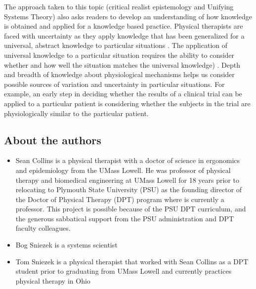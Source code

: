  The approach taken to this topic (critical realist epistemology and Unifying Systems Theory) also asks readers to develop an understanding of how knowledge is obtained and applied for a knowledge based practice. Physical therapists are faced with uncertainty as they apply knowledge that has been generalized for a universal, abstract knowledge to particular situations \cite{collins_complex_2005}. The application of universal knowledge to a particular situation requires the ability to consider whether and how well the situation matches the universal knowledge) \cite{collins_synthesis_2018, collins_particulars_2018}. Depth and breadth of knowledge about physiological mechanisms helps us consider possible sources of variation and uncertainty in particular situations. For example, an early step in deciding whether the results of a clinical trial can be applied to a particular patient is considering whether the subjects in the trial are physiologically similar to the particular patient.


\subsection*{About the authors}

\begin{itemize}
\item Sean Collins is a physical therapist with a doctor of science in ergonomics and epidemiology from the UMass Lowell. He was professor of physical therapy and biomedical engineering at UMass Lowell for 18 years prior to relocating to Plymouth State University (PSU) as the founding director of the Doctor of Physical Therapy (DPT) program where is currently a professor. This project is possible because of the PSU DPT curriculum, and the generous sabbatical support from the PSU administration and DPT faculty colleagues.
\item Bog Sniezek is a systems scientist
\item Tom Sniezek is a physical therapist that worked with Sean Collins as a DPT student prior to graduating from UMass Lowell and currently practices physical therapy in Ohio
\end{itemize}

\printbibliography[heading=subbibintoc]



